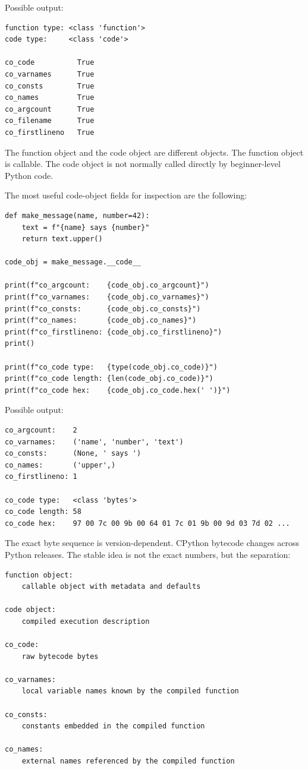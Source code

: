 Possible output:

\begin{verbatim}
function type: <class 'function'>
code type:     <class 'code'>

co_code          True
co_varnames      True
co_consts        True
co_names         True
co_argcount      True
co_filename      True
co_firstlineno   True
\end{verbatim}

The function object and the code object are different objects. The function object is callable. The code object is not normally called directly by beginner-level Python code.

The most useful code-object fields for inspection are the following:

\begin{verbatim}
def make_message(name, number=42):
    text = f"{name} says {number}"
    return text.upper()

code_obj = make_message.__code__

print(f"co_argcount:    {code_obj.co_argcount}")
print(f"co_varnames:    {code_obj.co_varnames}")
print(f"co_consts:      {code_obj.co_consts}")
print(f"co_names:       {code_obj.co_names}")
print(f"co_firstlineno: {code_obj.co_firstlineno}")
print()

print(f"co_code type:   {type(code_obj.co_code)}")
print(f"co_code length: {len(code_obj.co_code)}")
print(f"co_code hex:    {code_obj.co_code.hex(' ')}")
\end{verbatim}

Possible output:

\begin{verbatim}
co_argcount:    2
co_varnames:    ('name', 'number', 'text')
co_consts:      (None, ' says ')
co_names:       ('upper',)
co_firstlineno: 1

co_code type:   <class 'bytes'>
co_code length: 58
co_code hex:    97 00 7c 00 9b 00 64 01 7c 01 9b 00 9d 03 7d 02 ...
\end{verbatim}

The exact byte sequence is version-dependent. CPython bytecode changes across Python releases. The stable idea is not the exact numbers, but the separation:

\begin{verbatim}
function object:
    callable object with metadata and defaults

code object:
    compiled execution description

co_code:
    raw bytecode bytes

co_varnames:
    local variable names known by the compiled function

co_consts:
    constants embedded in the compiled function

co_names:
    external names referenced by the compiled function
\end{verbatim}

